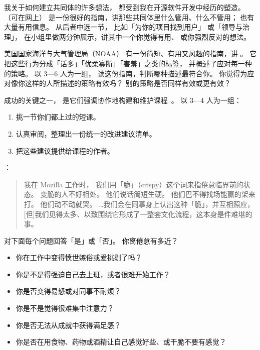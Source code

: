 
我关于如何建立共同体的许多想法，
都受到我在开源软件开发中经历的塑造。
\cite{Foge2005}（可在网上）
是一份很好的指南，讲那些共同体里什么管用、什么不管用；
也有大量有用信息。
从后者中选一节，
比如「为你的项目找到用户」
或「领导与治理」，
在小组里做两分钟展示，讲其中一个你觉得有用、
或你强烈反对的想法。


美国国家海洋与大气管理局（NOAA）
有一份简短、有用又风趣的指南，讲
。
它把这些行为分成「话多」「优柔寡断」「害羞」之类的标签，
并概述了应对每一种的策略。
以 3—6 人为一组，
读这份指南，判断哪种描述最符合你。
你觉得为应对像你这样的人所描述的策略有效吗？
别的策略是否同样有效或更有效？


 成功的关键之一，
是它们强调协作地构建和维护课程~\cite{Wils2016,Deve2018}。
以 3—4 人为一组：

\begin{enumerate}

\item
  挑一节你们都上过的短课。

\item
  认真审阅，整理出一份统一的改进建议清单。

\item
  把这些建议提供给课程的作者。

\end{enumerate}


：

\begin{quote}
  我在 Mozilla 工作时，
  我们用「脆」（crispy）这个词来指倦怠临界前的状态。
  变脆的人不好相处。
  他们说话简短生硬。
  他们巴不得找场能赢的架来打。
  他们动不动就哭。
  {\ldots}我们会在同事身上认出这种「脆」，并互相照应，
  [但]我们见得太多、以致围绕它形成了一整套文化流程，这本身是件难堪的事。
\end{quote}

\noindent
对下面每个问题回答「是」或「否」。
你离倦怠有多近？

\begin{itemize}
\item 你在工作中变得愤世嫉俗或爱挑剔了吗？
\item 你是不是得强迫自己去上班，或者很难开始工作？
\item 你是否变得易怒或对同事不耐烦？
\item 你是不是觉得很难集中注意力？
\item 你是否无法从成就中获得满足感？
\item 你是否在用食物、药物或酒精让自己感觉好些、或干脆不要有感觉？
\end{itemize}

